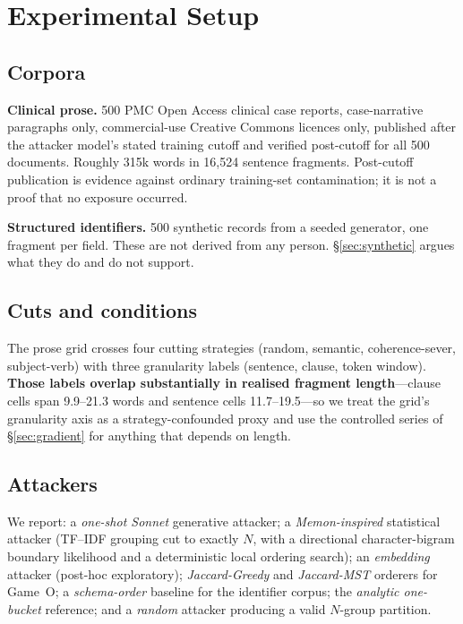\documentclass[sigconf,nonacm]{acmart}
\begin{document}
\section{Experimental Setup}
\label{sec:setup}

\subsection{Corpora}
\textbf{Clinical prose.} 500 PMC Open Access clinical case reports,
case-narrative paragraphs only, commercial-use Creative Commons licences only,
published after the attacker model's stated training cutoff and verified
post-cutoff for all 500 documents. Roughly 315k words in 16{,}524 sentence
fragments. Post-cutoff publication is evidence against ordinary training-set
contamination; it is not a proof that no exposure occurred.

\textbf{Structured identifiers.} 500 synthetic records from a seeded generator,
one fragment per field. These are not derived from any person.
\S\ref{sec:synthetic} argues what they do and do not support.

\subsection{Cuts and conditions}
The prose grid crosses four cutting strategies (random, semantic,
coherence-sever, subject-verb) with three granularity labels (sentence, clause,
token window). \textbf{Those labels overlap substantially in realised fragment
length}---clause cells span 9.9--21.3 words and sentence cells 11.7--19.5---so we
treat the grid's granularity axis as a strategy-confounded proxy and use the
controlled series of \S\ref{sec:gradient} for anything that depends on length.

\subsection{Attackers}
We report: a \emph{one-shot Sonnet} generative attacker; a \emph{Memon-inspired}
statistical attacker (TF--IDF grouping cut to exactly $N$, with a directional
character-bigram boundary likelihood and a deterministic local ordering search);
an \emph{embedding} attacker (post-hoc exploratory); \emph{Jaccard-Greedy} and
\emph{Jaccard-MST} orderers for Game~O; a \emph{schema-order} baseline for the
identifier corpus; the \emph{analytic one-bucket} reference; and a \emph{random}
attacker producing a valid $N$-group partition.
\end{document}
